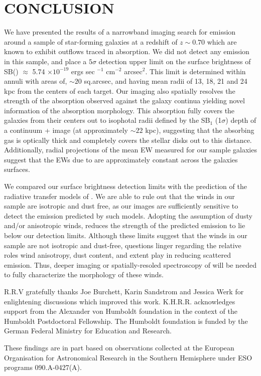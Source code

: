 \documentclass[twocolumn]{aastex61}
\begin{document}
\section{CONCLUSION}\label{sec:conclusion}
We have presented the results of a narrowband imaging search for  emission around a sample of star-forming galaxies at a redshift of $z \sim 0.70$ which are known to exhibit outflows traced in  absorption. We did not detect any  emission in this sample, and place a $5\sigma$ detection upper limit on the surface brightness of SB() $\approx$ 5.74 $\times 10^{-19}$ ergs sec $^{-1}$ cm$^{-2}$ arcsec$^2$. This limit is determined within annuli with areas of, $\sim 20$ sq.arcsec, and having mean radii of 13, 18, 21 and 24 kpc from the centers of each target. Our imaging also spatially resolves the strength of the  absorption observed against the galaxy continua yielding novel information of the  absorption morphology. This absorption fully covers the galaxies from their centers out to isophotal radii defined by the SB$_1$ (1$\sigma$) depth of a continuum +  image (at approximately $\sim 22$ kpc), suggesting that the absorbing gas is optically thick and completely covers the stellar disks out to this distance. Additionally, radial projections of the mean EW measured for our sample galaxies suggest that the EWs due to  are approximately constant across the galaxies surfaces. 

We compared our surface brightness detection limits with the prediction of the radiative transfer models of \cite{Prochaska_2011}. We are able to rule out that the winds in our sample are isotropic and dust free, as our images are sufficiently sensitive to detect the emission predicted by such models. Adopting the assumption of dusty and/or anisotropic winds, reduces the strength of the predicted  emission to lie below our detection limits. Although these limits suggest that the winds in our sample are not isotropic and dust-free, questions linger regarding the relative roles wind anisotropy, dust content, and extent play in reducing scattered emission. Thus, deeper imaging or spatially-resoled spectroscopy of  will be needed to fully characterize the morphology of these winds. 

\acknowledgements
R.R.V gratefully thanks Joe Burchett, Karin Sandstrom and Jessica Werk for enlightening discussions which improved this work.
K.H.R.R. acknowledges support from the Alexander von Humboldt foundation in the context of the Humboldt Postdoctoral Fellowship. The Humboldt foundation is funded by the German Federal Ministry for Education and Research.

These findings are in part based on observations collected at the
European Organisation for Astronomical Research in the Southern
Hemisphere under ESO programs 090.A-0427(A).

\newpage

\end{document}
